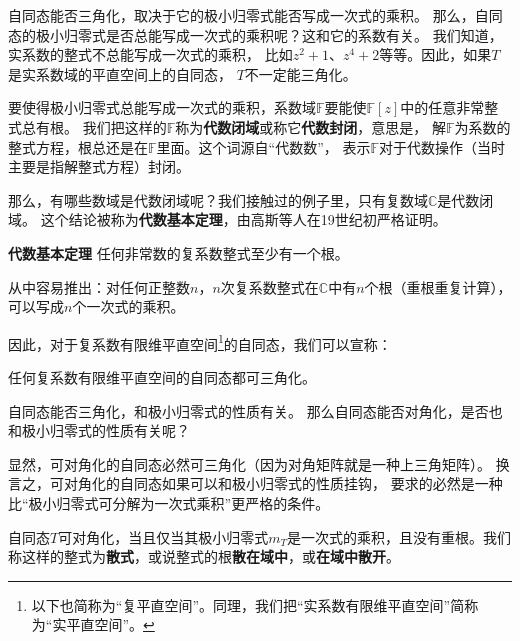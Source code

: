 \documentclass[12pt,UTF8]{ctexbook}
\begin{document}
自同态能否三角化，取决于它的极小归零式能否写成一次式的乘积。
那么，自同态的极小归零式是否总能写成一次式的乘积呢？这和它的系数有关。
我们知道，实系数的整式不总能写成一次式的乘积，
比如$z^2+1$、$z^4+2$等等。因此，如果$T$是实系数域的平直空间上的自同态，
$T$不一定能三角化。

要使得极小归零式总能写成一次式的乘积，系数域$\mathbb{F}$要能使$\mathbb{F}[z]$中的任意非常整式总有根。
我们把这样的$\mathbb{F}$称为\textbf{代数闭域}或称它\textbf{代数封闭}，意思是，
解$\mathbb{F}$为系数的整式方程，根总还是在$\mathbb{F}$里面。这个词源自“代数数”，
表示$\mathbb{F}$对于代数操作（当时主要是指解整式方程）封闭。

那么，有哪些数域是代数闭域呢？我们接触过的例子里，只有复数域$\mathbb{C}$是代数闭域。
这个结论被称为\textbf{代数基本定理}，由高斯等人在19世纪初严格证明。

\begin{pp}\textbf{代数基本定理}\label{pp:6_9}
    任何非常数的复系数整式至少有一个根。
\end{pp}
从中容易推出：对任何正整数$n$，$n$次复系数整式在$\mathbb{C}$中有$n$个根（重根重复计算），可以写成$n$个一次式的乘积。

因此，对于复系数有限维平直空间\footnote{以下也简称为“复平直空间”。同理，我们把“实系数有限维平直空间”简称为“实平直空间”。}的自同态，我们可以宣称：
\begin{pp}\label{pp:6_10}
    任何复系数有限维平直空间的自同态都可三角化。
\end{pp}

自同态能否三角化，和极小归零式的性质有关。
那么自同态能否对角化，是否也和极小归零式的性质有关呢？

显然，可对角化的自同态必然可三角化（因为对角矩阵就是一种上三角矩阵）。
换言之，可对角化的自同态如果可以和极小归零式的性质挂钩，
要求的必然是一种比“极小归零式可分解为一次式乘积”更严格的条件。

\begin{pp}\label{pp:6_11}
    自同态$T$可对角化，当且仅当其极小归零式$m_T$是一次式的乘积，且没有重根。我们称这样的整式为\textbf{散式}，或说整式的根\textbf{散在域中}，或\textbf{在域中散开}。
\end{pp}
\end{document}
